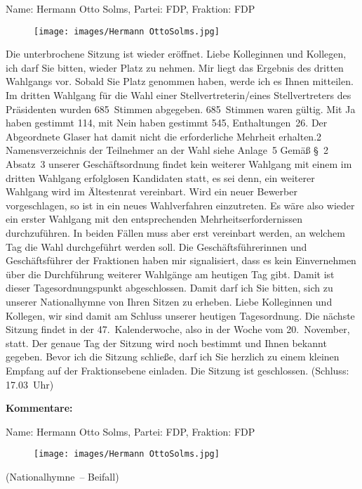 \documentclass[10pt, a4paper]{report}
\begin{document}
Name: Hermann Otto Solms, Partei: FDP, Fraktion: FDP

\begin{figure}[!ht]
\texttt{[image: images/Hermann OttoSolms.jpg]}
\end{figure}


Die unterbrochene Sitzung ist wieder eröffnet. Liebe Kolleginnen und Kollegen, ich darf Sie bitten, wieder Platz zu nehmen. Mir liegt das Ergebnis des dritten Wahlgangs vor. Sobald Sie Platz genommen haben, werde ich es Ihnen mitteilen. Im dritten Wahlgang für die Wahl einer Stellvertreterin/eines Stellvertreters des Präsidenten wurden 685 Stimmen abgegeben. 685 Stimmen waren gültig. Mit Ja haben gestimmt 114, mit Nein haben gestimmt 545, Enthaltungen 26. Der Abgeordnete Glaser hat damit nicht die erforderliche Mehrheit erhalten.2 Namensverzeichnis der Teilnehmer an der Wahl siehe Anlage 5 Gemäß § 2 Absatz 3 unserer Geschäftsordnung findet kein weiterer Wahlgang mit einem im dritten Wahlgang erfolglosen Kandidaten statt, es sei denn, ein weiterer Wahlgang wird im Ältestenrat vereinbart. Wird ein neuer Bewerber vorgeschlagen, so ist in ein neues Wahlverfahren einzutreten. Es wäre also wieder ein erster Wahlgang mit den entsprechenden Mehrheitserfordernissen durchzuführen. In beiden Fällen muss aber erst vereinbart werden, an welchem Tag die Wahl durchgeführt werden soll. Die Geschäftsführerinnen und Geschäftsführer der Fraktionen haben mir signalisiert, dass es kein Einvernehmen über die Durchführung weiterer Wahlgänge am heutigen Tag gibt. Damit ist dieser Tagesordnungspunkt abgeschlossen. Damit darf ich Sie bitten, sich zu unserer Nationalhymne von Ihren Sitzen zu erheben. Liebe Kolleginnen und Kollegen, wir sind damit am Schluss unserer heutigen Tagesordnung. Die nächste Sitzung findet in der 47. Kalenderwoche, also in der Woche vom 20. November, statt. Der genaue Tag der Sitzung wird noch bestimmt und Ihnen bekannt gegeben. Bevor ich die Sitzung schließe, darf ich Sie herzlich zu einem kleinen Empfang auf der Fraktionsebene einladen. Die Sitzung ist geschlossen. (Schluss: 17.03 Uhr) 

\textbf{Kommentare:}

Name: Hermann Otto Solms, Partei: FDP, Fraktion: FDP

\begin{figure}[!ht]
\texttt{[image: images/Hermann OttoSolms.jpg]}
\end{figure}


(Nationalhymne – Beifall)
\end{document}
